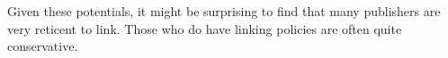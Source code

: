 

Given these potentials, it might be surprising to find that many publishers are very reticent to link. Those who do have linking policies are often quite conservative.

